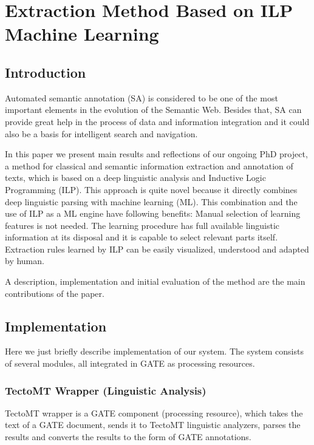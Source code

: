 \chapter{Extraction Method Based on ILP Machine Learning} \label{ch:ILP_Learning}
\graphicspath{{../img/ch60/}}


\section{Introduction}
Automated semantic annotation (SA) is considered to be one of the most important elements in the evolution of the Semantic Web. Besides that, SA can provide great help in the process of data and information integration and it could also be a basis for intelligent search and navigation.

In this paper we present main results and reflections of our ongoing PhD project, a method for classical and semantic information extraction and annotation of texts, which is based on a deep linguistic analysis and Inductive Logic Programming (ILP). This approach is quite novel because it directly combines deep linguistic parsing with machine learning (ML). This combination and the use of ILP as a ML engine have following benefits: Manual selection of learning features is not needed. 
The learning procedure has full available linguistic information at its disposal and it is capable to select relevant parts itself. Extraction rules learned by ILP can be easily visualized, understood and adapted by human.

A description, implementation and initial evaluation of the method are the main contributions of the paper.









\section{Implementation}
Here we just briefly describe implementation of our system. The system consists of several modules, all integrated in GATE as processing resources.

\subsection{TectoMT Wrapper (Linguistic Analysis)} 

TectoMT wrapper is a GATE component (processing resource), which takes the text of a GATE document, sends it to TectoMT linguistic analyzers, parses the results and converts the results to the form of GATE annotations.

